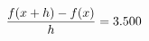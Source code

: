 \documentclass[preview]{standalone}
\begin{document}
\begin{align*}
\special{dvisvgm:raw <g id='unique000'>}\frac{f(x+h)-f(x)}{h} = 3.500\special{dvisvgm:raw </g>}
\end{align*}
\end{document}
